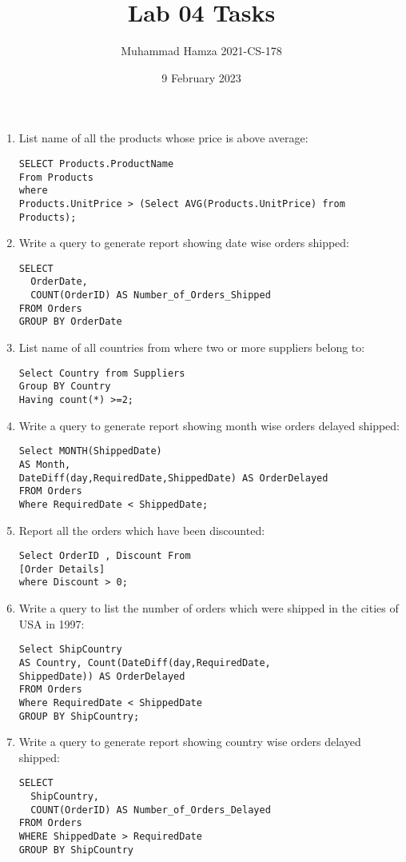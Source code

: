 \documentclass{article}
\title{Lab 04 Tasks}
\author{Muhammad Hamza 
         2021-CS-178}
\date{9 February 2023}
\begin{document}
\maketitle

\begin{enumerate}
\item List name of all the products whose price is above average:
\begin{verbatim}
SELECT Products.ProductName
From Products
where
Products.UnitPrice > (Select AVG(Products.UnitPrice) from Products);
\end{verbatim}

\item Write a query to generate report showing date wise orders shipped:
\begin{verbatim}
SELECT 
  OrderDate, 
  COUNT(OrderID) AS Number_of_Orders_Shipped
FROM Orders
GROUP BY OrderDate
\end{verbatim}

\item List name of all countries from where two or more suppliers belong to:
\begin{verbatim}
Select Country from Suppliers
Group BY Country
Having count(*) >=2;
\end{verbatim}

\item Write a query to generate report showing month wise orders delayed shipped:
\begin{verbatim}
Select MONTH(ShippedDate) 
AS Month,
DateDiff(day,RequiredDate,ShippedDate) AS OrderDelayed 
FROM Orders 
Where RequiredDate < ShippedDate;
\end{verbatim}

\item Report all the orders which have been discounted:
\begin{verbatim}
Select OrderID , Discount From
[Order Details]
where Discount > 0;
\end{verbatim}

\item Write a query to list the number of orders which were shipped in the cities of USA in 1997:
\begin{verbatim}
Select ShipCountry
AS Country, Count(DateDiff(day,RequiredDate,
ShippedDate)) AS OrderDelayed 
FROM Orders
Where RequiredDate < ShippedDate
GROUP BY ShipCountry;
\end{verbatim}

\item Write a query to generate report showing country wise orders delayed shipped:
\begin{verbatim}
SELECT 
  ShipCountry, 
  COUNT(OrderID) AS Number_of_Orders_Delayed
FROM Orders
WHERE ShippedDate > RequiredDate
GROUP BY ShipCountry
\end{verbatim}


\end{enumerate}
\end{document}

